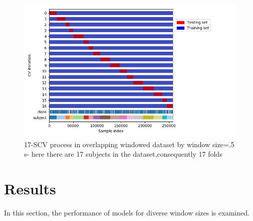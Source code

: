 \begin{figure}[h]
    \centering
    \includegraphics[width=.5\textwidth]{Figures/LeaveOneGroupOut.png}
    \caption{17-SCV process in overlapping windowed dataset by window size=.5 s- here there are 17 subjects in the dataset,consequently 17 folds  }
    \label{fig:Subjective-cv}
\end{figure}


\section{Results}

In this section, the performance of models for diverse window sizes is examined.


